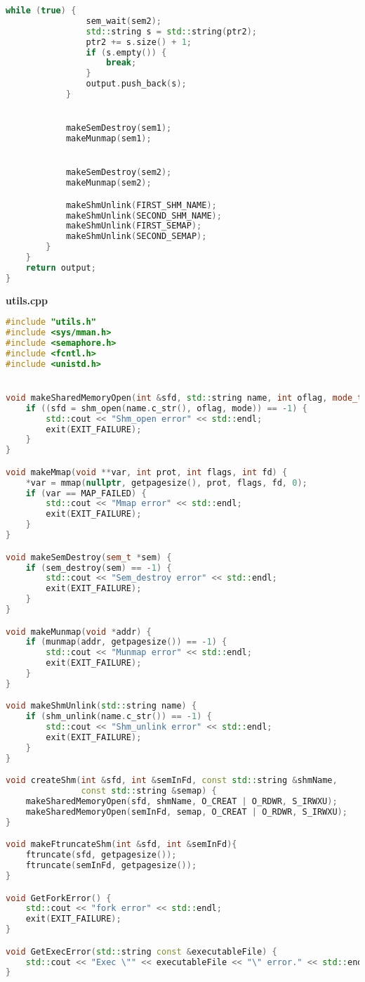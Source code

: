 \documentclass[pdf, unicode, 12pt, a4paper,oneside,fleqn]{article}
\begin{document}
\begin{lstlisting}[language=C++]
            while (true) {
                sem_wait(sem2);
                std::string s = std::string(ptr2);
                ptr2 += s.size() + 1;
                if (s.empty()) {
                    break;
                }
                output.push_back(s);
            }


            makeSemDestroy(sem1);
            makeMunmap(sem1);


            makeSemDestroy(sem2);
            makeMunmap(sem2);

            makeShmUnlink(FIRST_SHM_NAME);
            makeShmUnlink(SECOND_SHM_NAME);
            makeShmUnlink(FIRST_SEMAP);
            makeShmUnlink(SECOND_SEMAP);
        }
    }
    return output;
}

\end{lstlisting}

{\large\textbf{utils.cpp}}

\begin{lstlisting}[language=C++]
#include "utils.h"
#include <sys/mman.h>
#include <semaphore.h>
#include <fcntl.h>
#include <unistd.h>


void makeSharedMemoryOpen(int &sfd, std::string name, int oflag, mode_t mode) {
    if ((sfd = shm_open(name.c_str(), oflag, mode)) == -1) {
        std::cout << "Shm_open error" << std::endl;
        exit(EXIT_FAILURE);
    }
}

void makeMmap(void **var, int prot, int flags, int fd) {
    *var = mmap(nullptr, getpagesize(), prot, flags, fd, 0);
    if (var == MAP_FAILED) {
        std::cout << "Mmap error" << std::endl;
        exit(EXIT_FAILURE);
    }
}

void makeSemDestroy(sem_t *sem) {
    if (sem_destroy(sem) == -1) {
        std::cout << "Sem_destroy error" << std::endl;
        exit(EXIT_FAILURE);
    }
}

void makeMunmap(void *addr) {
    if (munmap(addr, getpagesize()) == -1) {
        std::cout << "Munmap error" << std::endl;
        exit(EXIT_FAILURE);
    }
}

void makeShmUnlink(std::string name) {
    if (shm_unlink(name.c_str()) == -1) {
        std::cout << "Shm_unlink error" << std::endl;
        exit(EXIT_FAILURE);
    }
}

void createShm(int &sfd, int &semInFd, const std::string &shmName,
               const std::string &semap) {
    makeSharedMemoryOpen(sfd, shmName, O_CREAT | O_RDWR, S_IRWXU);
    makeSharedMemoryOpen(semInFd, semap, O_CREAT | O_RDWR, S_IRWXU);
}

void makeFtruncateShm(int &sfd, int &semInFd){
    ftruncate(sfd, getpagesize());
    ftruncate(semInFd, getpagesize());
}

void GetForkError() {
    std::cout << "fork error" << std::endl;
    exit(EXIT_FAILURE);
}

void GetExecError(std::string const &executableFile) {
    std::cout << "Exec \"" << executableFile << "\" error." << std::endl;
}

\end{lstlisting}
\end{document}
